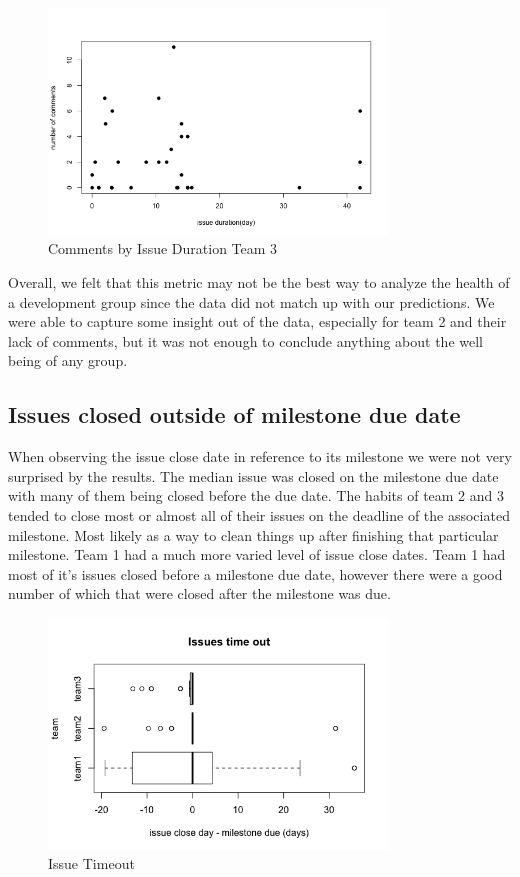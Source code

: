 \documentclass[conference]{IEEEtran}
\begin{document}
\begin{figure}[H]
    \centering
    \includegraphics[width=9cm]{../AprilProject/pic/comments_and_issue_duration3.png}
    \caption{Comments by Issue Duration Team 3}
    \label{comments_duration_3}
\end{figure}

Overall, we felt that this metric may not be the best way to analyze the health of a development group since the data did not match up with our predictions. We were able to capture some insight out of the data, especially for team 2 and their lack of comments, but it was not enough to conclude anything about the well being of any group. 


\subsection{Issues closed outside of milestone due date}
When observing the issue close date in reference to its milestone we were not very surprised by the results. The median issue was closed on the milestone due date with many of them being closed before the due date. The habits of team 2 and 3 tended to close most or almost all of their issues on the deadline of the associated milestone. Most likely as a way to clean things up after finishing that particular milestone. Team 1 had a much more varied level of issue close dates. Team 1 had most of it's issues closed before a milestone due date, however there were a good number of which that were closed after the milestone was due. 

\begin{figure}[H]
    \centering
    \includegraphics[width=9cm]{../AprilProject/pic/issues_timeout.png}
    \caption{Issue Timeout}
    \label{issue_timeout}
\end{figure}
\end{document}
